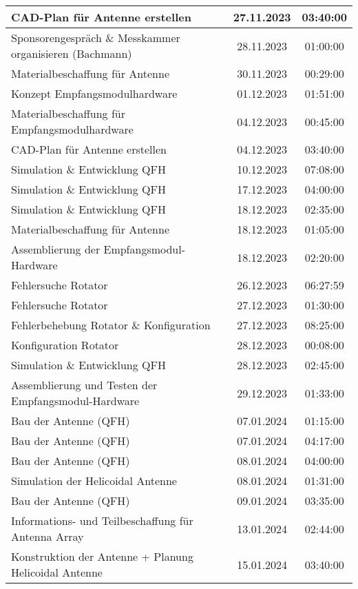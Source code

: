 \begin{longtable}{|l|c|c|}
	\hline
	CAD-Plan für Antenne erstellen & 27.11.2023 & 03:40:00 \\
	\hline
	Sponsorengespräch \& Messkammer organisieren (Bachmann) & 28.11.2023 & 01:00:00 \\
	\hline
	Materialbeschaffung für Antenne & 30.11.2023 & 00:29:00 \\
	\hline
	Konzept Empfangsmodulhardware & 01.12.2023 & 01:51:00 \\
	\hline
	Materialbeschaffung für Empfangsmodulhardware & 04.12.2023 & 00:45:00 \\
	\hline
	CAD-Plan für Antenne erstellen & 04.12.2023 & 03:40:00 \\
	\hline
	Simulation \& Entwicklung QFH & 10.12.2023 & 07:08:00 \\
	\hline
	Simulation \& Entwicklung QFH & 17.12.2023 & 04:00:00 \\
	\hline
	Simulation \& Entwicklung QFH & 18.12.2023 & 02:35:00 \\
	\hline
	Materialbeschaffung für Antenne & 18.12.2023 & 01:05:00 \\
	\hline
	Assemblierung der Empfangsmodul-Hardware & 18.12.2023 & 02:20:00 \\
	\hline
	Fehlersuche Rotator & 26.12.2023 & 06:27:59 \\
	\hline
	Fehlersuche Rotator & 27.12.2023 & 01:30:00 \\
	\hline
	Fehlerbehebung Rotator \& Konfiguration & 27.12.2023 & 08:25:00 \\
	\hline
	Konfiguration Rotator & 28.12.2023 & 00:08:00 \\
	\hline
	Simulation \& Entwicklung QFH & 28.12.2023 & 02:45:00 \\
	\hline
	Assemblierung und Testen der Empfangsmodul-Hardware & 29.12.2023 & 01:33:00 \\
	\hline
	Bau der Antenne (QFH) & 07.01.2024 & 01:15:00 \\
	\hline
	Bau der Antenne (QFH) & 07.01.2024 & 04:17:00 \\
	\hline
	Bau der Antenne (QFH) & 08.01.2024 & 04:00:00 \\
	\hline
	Simulation der Helicoidal Antenne & 08.01.2024 & 01:31:00 \\
	\hline
	Bau der Antenne (QFH) & 09.01.2024 & 03:35:00 \\
	\hline
	Informations- und Teilbeschaffung für Antenna Array & 13.01.2024 & 02:44:00 \\
	\hline
	Konstruktion der Antenne + Planung Helicoidal Antenne & 15.01.2024 & 03:40:00 \\

\end{longtable}
